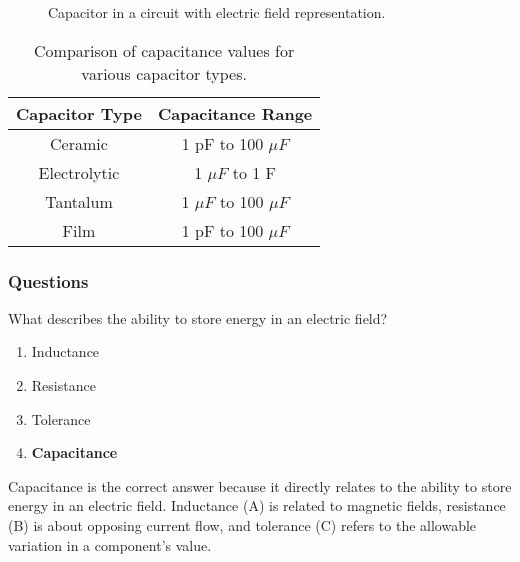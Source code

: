 \begin{figure}[h]
    \centering
    \caption{Capacitor in a circuit with electric field representation.}
    \label{fig:capacitor-circuit}
\end{figure}

\begin{table}[h]
    \centering
    \begin{tabular}{|c|c|}
        \hline
        \textbf{Capacitor Type} & \textbf{Capacitance Range} \\
        \hline
        Ceramic & 1 pF to 100 \(\mu F\) \\
        Electrolytic & 1 \(\mu F\) to 1 F \\
        Tantalum & 1 \(\mu F\) to 100 \(\mu F\) \\
        Film & 1 pF to 100 \(\mu F\) \\
        \hline
    \end{tabular}
    \caption{Comparison of capacitance values for various capacitor types.}
    \label{tab:capacitance-values}
\end{table}

\subsubsection*{Questions}

\begin{tcolorbox}[colback=gray!10!white,colframe=black!75!black,title={T5C01}]
    What describes the ability to store energy in an electric field?
    \begin{enumerate}[label=\Alph*),noitemsep]
        \item Inductance
        \item Resistance
        \item Tolerance
        \item \textbf{Capacitance}
    \end{enumerate}
\end{tcolorbox}

Capacitance is the correct answer because it directly relates to the ability to store energy in an electric field. Inductance (A) is related to magnetic fields, resistance (B) is about opposing current flow, and tolerance (C) refers to the allowable variation in a component's value.

